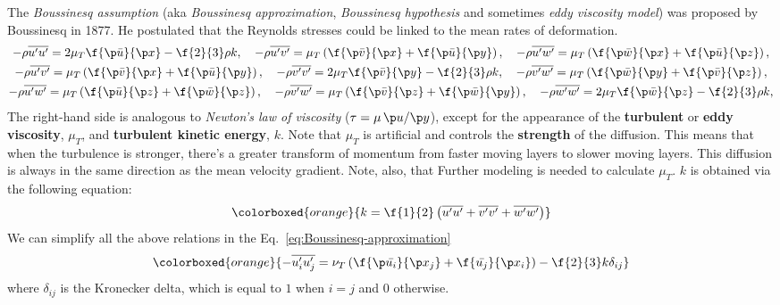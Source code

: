 The \emph{Boussinesq assumption} (aka \emph{Boussinesq approximation}, \emph{Boussinesq hypothesis} and sometimes \emph{eddy viscosity model}) was proposed by Boussinesq in 1877. He postulated that the Reynolds stresses could be linked to the mean rates of deformation.
%
\begin{equation}
  \begin{gathered}
    -\rho \overline{u^\prime u^\prime} = 2 \mu_T \f{\p \bar{u}}{\p x} - \f{2}{3} \rho k,\quad
    -\rho \overline{u^\prime v^\prime} = \mu_T \left( \f{\p \bar{v}}{\p x} + \f{\p \bar{u}}{\p y} \right),\quad
    -\rho \overline{u^\prime w^\prime} = \mu_T \left( \f{\p \bar{w}}{\p x} + \f{\p \bar{u}}{\p z} \right), \\
    -\rho \overline{u^\prime v^\prime} = \mu_T \left( \f{\p \bar{v}}{\p x} + \f{\p \bar{u}}{\p y} \right),\quad
    -\rho \overline{v^\prime v^\prime} = 2 \mu_T \f{\p \bar{v}}{\p y} - \f{2}{3} \rho k,\quad
    -\rho \overline{v^\prime w^\prime} = \mu_T \left( \f{\p \bar{w}}{\p y} + \f{\p \bar{v}}{\p z} \right), \\
    -\rho \overline{u^\prime w^\prime} = \mu_T \left( \f{\p \bar{u}}{\p z} + \f{\p \bar{w}}{\p z} \right),\quad
    -\rho \overline{v^\prime w^\prime} = \mu_T \left( \f{\p \bar{v}}{\p z} + \f{\p \bar{w}}{\p y} \right),\quad
    -\rho \overline{w^\prime w^\prime} = 2 \mu_T \f{\p \bar{w}}{\p z} - \f{2}{3} \rho k,
  \end{gathered}
  \label{eq:Boussinesq-approximation}
\end{equation}
%
The right-hand side is analogous to \emph{Newton’s law of viscosity} (\(\tau = \mu\,{\p u}/{\p y}\)), except for the appearance of the \textbf{turbulent} or \textbf{eddy viscosity}, \(\mu_T\), and \textbf{turbulent kinetic energy}, \(k\).
Note that \(\mu_T\) is artificial and controls the \textbf{strength} of the diffusion.
This means that when the turbulence is stronger, there's a greater transform of momentum from faster moving layers to slower moving layers.
This diffusion is always in the same direction as the mean velocity gradient.
Note, also, that Further modeling is needed to calculate \(\mu_T\).
\(k\) is obtained via the following equation:
%
\begin{equation}
  \colorboxed{orange}{
    k = \f{1}{2} \left(\overline{u^\prime u^\prime} + \overline{v^\prime v^\prime} + \overline{w^\prime w^\prime}\right)
  }
  \label{eq:turbulent-kinetic-energy}
\end{equation}
%
We can simplify all the above relations in the Eq.~\ref{eq:Boussinesq-approximation}
%
\begin{equation}
  \colorboxed{orange}{
    -\overline{u^\prime_i u^\prime_j} = \nu_T \left( \f{\p \bar{u_i}}{\p x_j} + \f{\bar{u_j}}{\p x_i}\right) - \f{2}{3} k \delta_{ij}
  }
  \label{eq:Boussinesq-approximation-index-notation}
\end{equation}
%
where \(\delta_{ij}\) is the Kronecker delta, which is equal to \(1\) when \(i = j\) and \(0\) otherwise.

